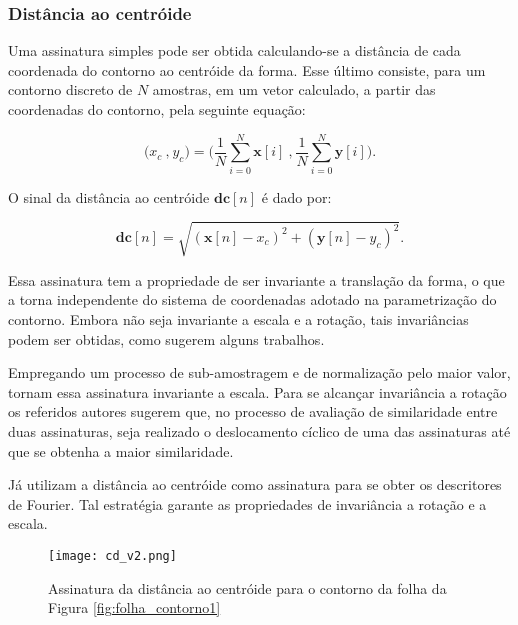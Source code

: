 \begin{comment}
Particularmente, métodos de extração de características multiescala do contorno a partir da curvatura conseguem superar o problema supracitado aplicando filtragens passa-baixa a representação paramétrica do contorno antes de se calcular a curvatura. 
\end{comment}

\subsubsection*{Distância ao centróide}
Uma assinatura simples pode ser obtida calculando-se a distância de cada coordenada do contorno ao centróide da forma. Esse último consiste, para um contorno discreto de $N$ amostras, em um vetor calculado, a partir das coordenadas do contorno, pela seguinte equação: 

\begin{equation}
\big(x_{c}\:\text{,}\:y_{c}\big) = \Big(\frac{1}{N}\sum^{N}_{i=0}{\mathbf{x}[i]}\:\text{,}\:\frac{1}{N}\sum^{N}_{i=0}{\mathbf{y}[i]}\Big)\text{.}
\end{equation}

O sinal da distância ao centróide $\mathbf{dc}[n]$ é dado por:

\begin{equation}
\mathbf{dc}[n] = \sqrt{(\mathbf{x}[n] - x_c)^2 + (\mathbf{y}[n] - y_c)^2}\text{.}
\end{equation}

Essa assinatura tem a propriedade de ser invariante a translação da forma, o que a torna independente do sistema de coordenadas adotado na parametrização do contorno. Embora não seja invariante a escala e a rotação, tais invariâncias podem ser obtidas, como sugerem alguns trabalhos. 

Empregando um processo de sub-amostragem e de normalização pelo maior valor,  tornam essa assinatura invariante a escala. Para se alcançar invariância a rotação os referidos autores sugerem que, no processo de avaliação de similaridade entre duas assinaturas, seja realizado o deslocamento cíclico de uma das assinaturas até que se obtenha a maior similaridade.

Já  utilizam a distância ao centróide como assinatura para se obter os descritores de Fourier. Tal estratégia garante as propriedades de invariância a rotação e a escala.

\begin{figure}[h!]
  \caption{\label{fig:cd} Assinatura da distância ao centróide para o contorno da folha da Figura \ref{fig:folha_contorno1}}
  \centering
  \texttt{[image: cd\_v2.png]}
\end{figure}

